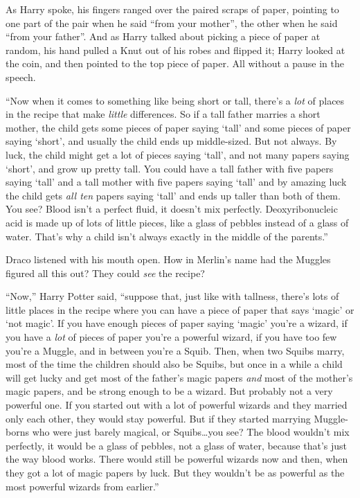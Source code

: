 As Harry spoke, his fingers ranged over the paired scraps of paper, pointing to one part of the pair when he said “from your mother”, the other when he said “from your father”. And as Harry talked about picking a piece of paper at random, his hand pulled a Knut out of his robes and flipped it; Harry looked at the coin, and then pointed to the top piece of paper. All without a pause in the speech.

“Now when it comes to something like being short or tall, there’s a \emph{lot} of places in the recipe that make \emph{little} differences. So if a tall father marries a short mother, the child gets some pieces of paper saying ‘tall’ and some pieces of paper saying ‘short’, and usually the child ends up middle-sized. But not always. By luck, the child might get a lot of pieces saying ‘tall’, and not many papers saying ‘short’, and grow up pretty tall. You could have a tall father with five papers saying ‘tall’ and a tall mother with five papers saying ‘tall’ and by amazing luck the child gets \emph{all ten} papers saying ‘tall’ and ends up taller than both of them. You see? Blood isn’t a perfect fluid, it doesn’t mix perfectly. Deoxyribonucleic acid is made up of lots of little pieces, like a glass of pebbles instead of a glass of water. That’s why a child isn’t always exactly in the middle of the parents.”

Draco listened with his mouth open. How in Merlin’s name had the Muggles figured all this out? They could \emph{see} the recipe?

“Now,” Harry Potter said, “suppose that, just like with tallness, there’s lots of little places in the recipe where you can have a piece of paper that says ‘magic’ or ‘not magic’. If you have enough pieces of paper saying ‘magic’ you’re a wizard, if you have a \emph{lot} of pieces of paper you’re a powerful wizard, if you have too few you’re a Muggle, and in between you’re a Squib. Then, when two Squibs marry, most of the time the children should also be Squibs, but once in a while a child will get lucky and get most of the father’s magic papers \emph{and} most of the mother’s magic papers, and be strong enough to be a wizard. But probably not a very powerful one. If you started out with a lot of powerful wizards and they married only each other, they would stay powerful. But if they started marrying Muggle-borns who were just barely magical, or Squibs…you see? The blood wouldn’t mix perfectly, it would be a glass of pebbles, not a glass of water, because that’s just the way blood works. There would still be powerful wizards now and then, when they got a lot of magic papers by luck. But they wouldn’t be as powerful as the most powerful wizards from earlier.”

